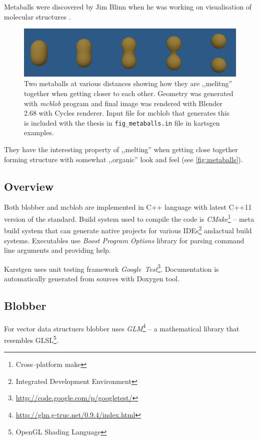 Metaballs were discovered by Jim Blinn when he was working on visualisation of
molecular structures \parencite{Blinn:1982:GAS:357306.357310}.
\label{sub:metaballs}
\begin{figure}[htb]
  \begin{center}
    \includegraphics[width=\textwidth]{chapters/project/metaballs.png}
  \end{center}
  \caption{Two metaballs at various distances showing how they are ,,melitng''
    together when getting closer to each other. Geometry was generated with
    \emph{mcblob} program and final image was rendered with Blender 2.68 with
    Cycles renderer. Input file for mcblob that generates this is included with the thesis
      in \texttt{fig\_metaballs.in} file in kartsgen examples.
  }
  \label{fig:metaballs}
\end{figure}

They have the interesting property of ,,melting'' when getting close together
forming structure with somewhat ,,organic'' look and feel (see \autoref{fig:metaballs}).

\subsection{Overview}
Both blobber and mcblob are implemented in C++ language with latest C++11
version of the standard. Build system used to compile the code is \emph{CMake}\footnote{Cross--platform make}
-- meta build system that can generate native projects for various IDEs\footnote{Integrated Development Environment}
andactual build systems. Executables use \emph{Boost Program Options} library
for parsing command line arguments and providing help.

Karstgen uses unit testing framework \emph{Google~Test}\footnote{\url{http://code.google.com/p/googletest/}}.
Documentation is automatically generated from sources with Doxygen
tool.


\subsection{Blobber}

For vector data structuers blobber uses \emph{GLM}\footnote{\url{http://glm.g-truc.net/0.9.4/index.html}}
-- a mathematical library that resembles GLSL\footnote{OpenGL Shading Language}.

